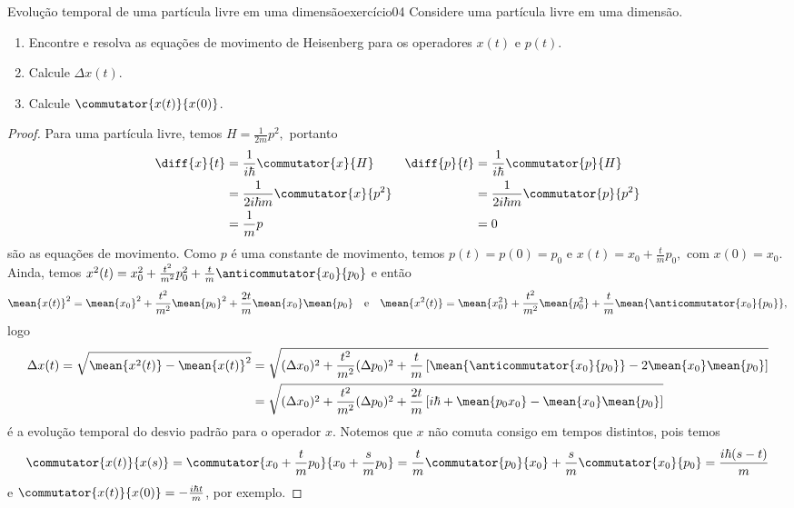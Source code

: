 \begin{exercício}{Evolução temporal de uma partícula livre em uma dimensão}{exercício04}
    Considere uma partícula livre em uma dimensão.
    \begin{enumerate}[label=(\alph*)]
        \item Encontre e resolva as equações de movimento de Heisenberg para os operadores \(x(t)\) e \(p(t)\).
        \item Calcule \(\Delta x(t)\).
        \item Calcule \(\commutator{x(t)}{x(0)}\).
    \end{enumerate}
\end{exercício}
\begin{proof}
    Para uma partícula livre, temos \(H = \frac{1}{2m}p^2,\) portanto
    \begin{align*}
        \diff{x}{t} &= \frac{1}{i \hbar}\commutator{x}{H}&
        \diff{p}{t} &= \frac{1}{i \hbar}\commutator{p}{H}\\
                    &= \frac{1}{2i \hbar m}\commutator{x}{p^2}&
                    &= \frac{1}{2i \hbar m} \commutator{p}{p^2}\\
                    &= \frac{1}{m}p&
                    &= 0
    \end{align*}
    são as equações de movimento. Como \(p\) é uma constante de movimento, temos \(p(t) = p(0) = p_0\) e \(x(t) = x_0 + \frac{t}{m}p_0,\) com \(x(0) = x_0\). Ainda, temos \(x^2(t) = x_0^2 + \frac{t^2}{m^2} p_0^2 + \frac{t}{m}\anticommutator{x_0}{p_0}\) e então
    \begin{equation*}
        \mean{x(t)}^2 = \mean{x_0}^2 + \frac{t^2}{m^2} \mean{p_0}^2 + \frac{2 t}{m} \mean{x_0} \mean{p_0}
        \quad\text{e}\quad
        \mean{x^2(t)} = \mean{x_0^2} + \frac{t^2}{m^2} \mean{p_0^2} + \frac{t}{m} \mean{\anticommutator{x_0}{p_0}},
    \end{equation*}
    logo
    \begin{align*}
        \Delta x(t) = \sqrt{\mean{x^2(t)} - \mean{x(t)}^2} &= \sqrt{(\Delta x_0)^2 + \frac{t^2}{m^2} (\Delta p_0)^2 + \frac{t}{m} \left[\mean{\anticommutator{x_0}{p_0}} - 2\mean{x_0}\mean{p_0}\right]}\\
                                                           &=\sqrt{(\Delta x_0)^2 + \frac{t^2}{m^2} (\Delta p_0)^2 + \frac{2t}{m} \left[i \hbar + \mean{p_0 x_0} - \mean{x_0}\mean{p_0}\right]}
    \end{align*}
    é a evolução temporal do desvio padrão para o operador \(x\). Notemos que \(x\) não comuta consigo em tempos distintos, pois temos
    \begin{equation*}
        \commutator{x(t)}{x(s)} = \commutator{x_0 + \frac{t}{m} p_0}{x_0 + \frac{s}{m} p_0} = \frac{t}{m}\commutator{p_0}{x_0}  +\frac{s}{m} \commutator{x_0}{p_0}= \frac{i\hbar (s - t)}{m}
    \end{equation*}
    e \(\commutator{x(t)}{x(0)} = -\frac{i \hbar t}{m}\), por exemplo.
\end{proof}
